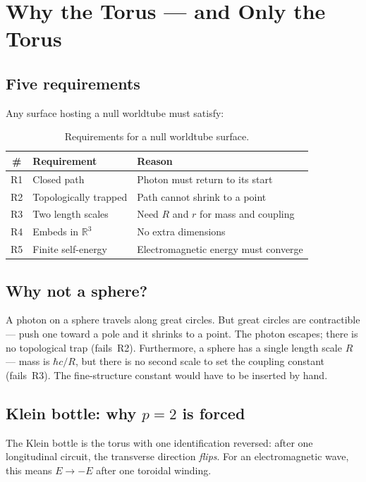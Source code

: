 \documentclass[11pt,a4paper]{article}
\begin{document}
\section{Why the Torus --- and Only the Torus}
\label{sec:topology}

\subsection{Five requirements}

Any surface hosting a null worldtube must satisfy:

\begin{table}[h]
\centering
\begin{tabular}{@{}clp{7cm}@{}}
\toprule
\# & Requirement & Reason \\
\midrule
R1 & Closed path & Photon must return to its start \\
R2 & Topologically trapped & Path cannot shrink to a point \\
R3 & Two length scales & Need $R$ and $r$ for mass and coupling \\
R4 & Embeds in $\mathbb{R}^3$ & No extra dimensions \\
R5 & Finite self-energy & Electromagnetic energy must converge \\
\bottomrule
\end{tabular}
\caption{Requirements for a null worldtube surface.}
\label{tab:requirements}
\end{table}

\subsection{Why not a sphere?}

A photon on a sphere travels along great circles. But great circles are contractible --- push one toward a pole and it shrinks to a point. The photon escapes; there is no topological trap (fails~R2). Furthermore, a sphere has a single length scale $R$ --- mass is $\hbar c/R$, but there is no second scale to set the coupling constant (fails~R3). The fine-structure constant would have to be inserted by hand.

\subsection{Klein bottle: why \texorpdfstring{$p = 2$}{p = 2} is forced}

The Klein bottle is the torus with one identification reversed: after one longitudinal circuit, the transverse direction \emph{flips}. For an electromagnetic wave, this means $E \to -E$ after one toroidal winding.
\end{document}
